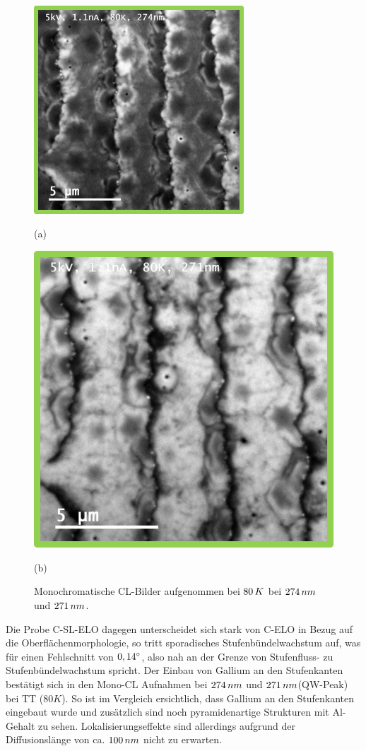 \begin{figure}[H]
  \centering
  \begin{minipage}[t]{0.49\textwidth}
    \centering
    \includegraphics[width=0.7\textwidth]{Bilder/TS4048/cSLELOmonocllow.png}
		\caption{(a)}
  \end{minipage}
	\hfill
  \begin{minipage}[t]{0.49\textwidth}
    \centering
    \includegraphics[width=0.7\linewidth]{Bilder/TS4048/cSLELOmonoclpeak.png}
		\caption{(b)}
  \end{minipage}
	\caption{Monochromatische CL-Bilder aufgenommen bei $80 \thinspace K$ bei $274 \thinspace nm$ und $271 \thinspace nm$. }
	\label{fig:monoclgesamt}
\end{figure}
\noindent 
Die Probe C-SL-ELO dagegen unterscheidet sich stark von C-ELO in Bezug auf die Oberflächenmorphologie, so tritt sporadisches Stufenbündelwachstum auf, was für einen Fehlschnitt von $0,14 \degree$, also nah an der Grenze von Stufenfluss- zu Stufenbündelwachstum spricht. Der Einbau von Gallium an den Stufenkanten bestätigt sich in den Mono-CL Aufnahmen bei $274 \thinspace nm$ und $271 \thinspace nm$(QW-Peak) bei TT ($80K$). So ist im Vergleich ersichtlich, dass Gallium an den Stufenkanten eingebaut wurde und zusätzlich sind noch pyramidenartige Strukturen mit Al-Gehalt zu sehen. Lokalisierungseffekte sind allerdings aufgrund der Diffusionslänge von ca. $100 \thinspace nm$ nicht zu erwarten.


